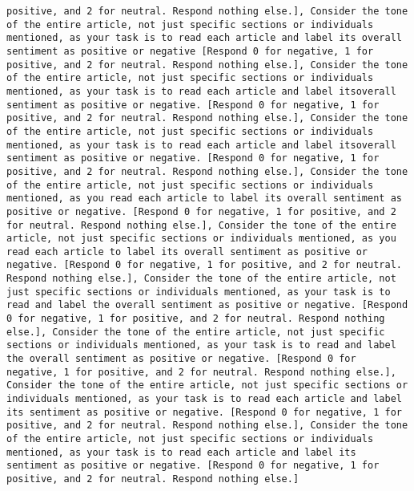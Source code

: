 \begin{lstlisting}[label=lst:poor_performing_prompts]
positive, and 2 for neutral. Respond nothing else.], Consider the tone of the entire article, not just specific sections or individuals mentioned, as your task is to read each article and label its overall sentiment as positive or negative [Respond 0 for negative, 1 for positive, and 2 for neutral. Respond nothing else.], Consider the tone of the entire article, not just specific sections or individuals mentioned, as your task is to read each article and label itsoverall sentiment as positive or negative. [Respond 0 for negative, 1 for positive, and 2 for neutral. Respond nothing else.], Consider the tone of the entire article, not just specific sections or individuals mentioned, as your task is to read each article and label itsoverall sentiment as positive or negative. [Respond 0 for negative, 1 for positive, and 2 for neutral. Respond nothing else.], Consider the tone of the entire article, not just specific sections or individuals mentioned, as you read each article to label its overall sentiment as positive or negative. [Respond 0 for negative, 1 for positive, and 2 for neutral. Respond nothing else.], Consider the tone of the entire article, not just specific sections or individuals mentioned, as you read each article to label its overall sentiment as positive or negative. [Respond 0 for negative, 1 for positive, and 2 for neutral. Respond nothing else.], Consider the tone of the entire article, not just specific sections or individuals mentioned, as your task is to read and label the overall sentiment as positive or negative. [Respond 0 for negative, 1 for positive, and 2 for neutral. Respond nothing else.], Consider the tone of the entire article, not just specific sections or individuals mentioned, as your task is to read and label the overall sentiment as positive or negative. [Respond 0 for negative, 1 for positive, and 2 for neutral. Respond nothing else.], Consider the tone of the entire article, not just specific sections or individuals mentioned, as your task is to read each article and label its sentiment as positive or negative. [Respond 0 for negative, 1 for positive, and 2 for neutral. Respond nothing else.], Consider the tone of the entire article, not just specific sections or individuals mentioned, as your task is to read each article and label its sentiment as positive or negative. [Respond 0 for negative, 1 for positive, and 2 for neutral. Respond nothing else.]

\end{lstlisting}
